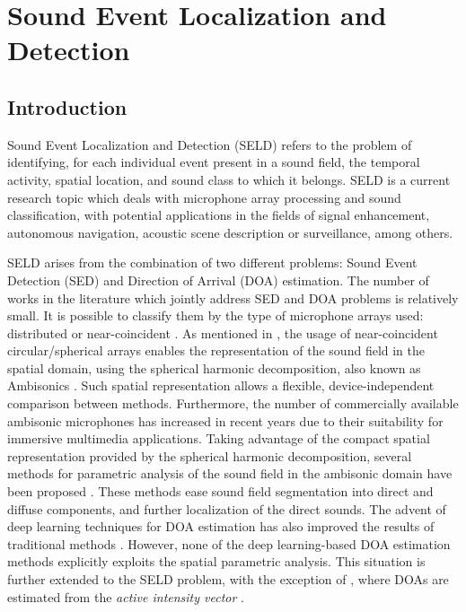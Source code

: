 \chapter{Sound Event Localization and Detection}


\section{Introduction}
\label{sec:intro}

Sound Event Localization and Detection (SELD) refers to the problem of identifying, for each individual  event present in a sound field, the temporal activity, spatial location, and sound class to which it belongs. SELD is a current research topic which deals with microphone array processing and sound classification, with potential applications in the fields of signal enhancement, autonomous navigation, acoustic scene description or surveillance, among others.

SELD arises from the combination of two different problems: Sound Event Detection (SED) and Direction of Arrival (DOA) estimation. The number of works in the literature which jointly address SED and DOA problems is relatively small. It is possible to classify them by the type of microphone arrays used: distributed \cite{grobler2017sound, butko2011two, chakraborty2014sound} or near-coincident \cite{hirvonen2015classification, lopatka2016detection, Adavanne2018_JSTSP}.
As mentioned in \cite{Adavanne2018_JSTSP}, the usage of near-coincident circular/spherical arrays enables the representation of the sound field in the spatial domain, using the spherical harmonic decomposition, also known as Ambisonics \cite{gerzon1973periphony, daniel2000representation}. Such spatial representation allows a flexible, device-independent comparison between methods. Furthermore, the number of commercially available ambisonic microphones has increased in recent years due to their suitability for immersive multimedia applications.  
Taking advantage of the compact spatial representation provided by the spherical harmonic decomposition, several methods for parametric analysis of the sound field in the ambisonic domain have been proposed  \cite{pulkki2006directional, berge2010high, Politis2018, pulkki2018parametric}.
These methods ease sound field segmentation into direct and diffuse components, and further localization of the direct sounds.
The advent of deep learning techniques for DOA estimation has also improved the results of traditional methods \cite{Adavanne2018_JSTSP}. However, none of the deep learning-based DOA estimation methods explicitly exploits the spatial parametric analysis. This situation is further extended to the SELD problem, with the exception of \cite{lopatka2016detection}, where DOAs are estimated from the \textit{active intensity vector}  \cite{pulkki2006directional}.

